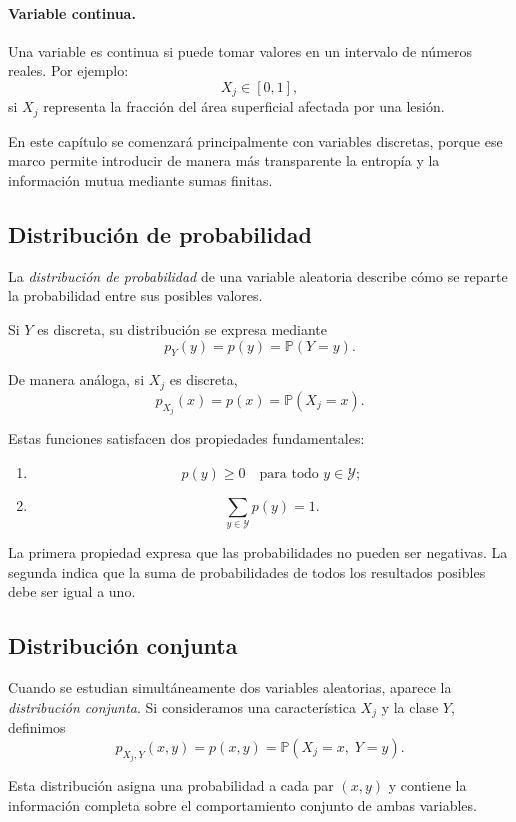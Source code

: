 \documentclass{article}
\begin{document}
\paragraph{Variable continua.}
Una variable es continua si puede tomar valores en un intervalo de números reales. Por ejemplo:
\[
X_j\in [0,1],
\]
si \(X_j\) representa la fracción del área superficial afectada por una lesión.

En este capítulo se comenzará principalmente con variables discretas, porque ese marco permite introducir de manera más transparente la entropía y la información mutua mediante sumas finitas.

\subsection{Distribución de probabilidad}

La \textit{distribución de probabilidad} de una variable aleatoria describe cómo se reparte la probabilidad entre sus posibles valores.

Si \(Y\) es discreta, su distribución se expresa mediante
\[
p_Y(y)=p(y)=\mathbb{P}(Y=y).
\]

De manera análoga, si \(X_j\) es discreta,
\[
p_{X_j}(x)=p(x)=\mathbb{P}(X_j=x).
\]

Estas funciones satisfacen dos propiedades fundamentales:

\begin{enumerate}
\item
\[
p(y)\geq 0 \quad \text{para todo } y\in\mathcal{Y};
\]

\item
\[
\sum_{y\in\mathcal{Y}} p(y)=1.
\]
\end{enumerate}

La primera propiedad expresa que las probabilidades no pueden ser negativas. La segunda indica que la suma de probabilidades de todos los resultados posibles debe ser igual a uno.

\subsection{Distribución conjunta}

Cuando se estudian simultáneamente dos variables aleatorias, aparece la \textit{distribución conjunta}. Si consideramos una característica \(X_j\) y la clase \(Y\), definimos
\[
p_{X_j,Y}(x,y)=p(x,y)=\mathbb{P}(X_j=x,\;Y=y).
\]

Esta distribución asigna una probabilidad a cada par \((x,y)\) y contiene la información completa sobre el comportamiento conjunto de ambas variables.
\end{document}
